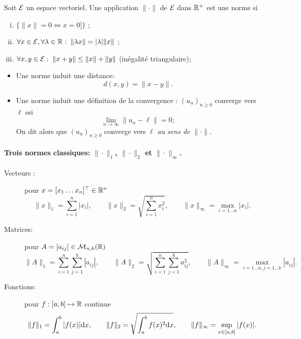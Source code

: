 \begin{definition*}
  Soit $\mathcal{E}$ un espace vectoriel. Une application $\|\cdot\|$ de $\mathcal{E}$ dans $\mathbb{R}^+$ est une norme si
  \begin{enumerate}[(i)]
    \item $\{\|x\| = 0 \Leftrightarrow x = 0]\}$ ;
    \item $\forall x \in \mathcal{E}, \forall \lambda \in \mathbb{R}: \; \|\lambda x\| = |\lambda| \|x\|$ ;
    \item $\forall x, y \in \mathcal{E}: \; \|x+y\| \leq \|x\| + \|y\|$ (inégalité triangulaire);
  \end{enumerate}
\end{definition*}

\remarks
\begin{itemize}
  \item Une norme induit une distance:
  $$
  d(x, y) = \|x - y\|.
  $$
  \item Une norme induit une définition de la convergence : $(u_n)_{n \geq 0}$ converge vers $\ell$ ssi
  $$
  \lim_{n \rightarrow \infty} \|u_n - \ell\| = 0;
  $$
  On dit alors que $(u_n)_{n \geq 0}$ converge vers $\ell$ {\em au sens de $\|\cdot\|$}.
\end{itemize}

\paragraph*{Trois normes classiques: $\|\cdot\|_1$, $\|\cdot\|_2$ et $\|\cdot\|_\infty$.}
\begin{description}
 \item[Vecteurs :] pour $x = [x_1 \dots x_n]^\top \in \mathbb{R}^n$
 $$
 \|x\|_1 = \sum_{i=1}^n |x_i|, \qquad 
 \|x\|_2 = \sqrt{\sum_{i=1}^n x_i^2}, \qquad 
 \|x\|_\infty = \max_{i = 1 \dots n} |x_i|. 
 $$
 \item[Matrices:] pour $A = [a_{ij}] \in \mathcal{M}_{n, k}(\mathbb{R})$
 $$
 \|A\|_1 = \sum_{i=1}^n \sum_{j=1}^k |a_{ij}|, \qquad 
 \|A\|_2 = \sqrt{\sum_{i=1}^n \sum_{j=1}^k a_{ij}^2}, \qquad 
 \|A\|_\infty = \max_{i = 1 \dots n, j = 1 \dots k} |a_{ij}|. 
 $$
 \item[Fonctions:] pour $f : [a, b] \mapsto \mathbb{R}$ continue
 $$
 \|f\|_1 = \int_a^b |f(x)| \text{d} x, \qquad 
 \|f\|_2 = \sqrt{\int_a^b f(x)^2 \text{d} x}, \qquad 
 \|f\|_\infty = \sup_{x \in [a, b]} |f(x)|.
 $$
\end{description}


